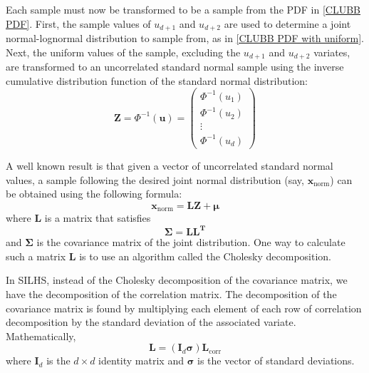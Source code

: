 \documentclass[11pt,fleqn]{article}
\begin{document}
Each sample must now be transformed to be a sample from the PDF in \eqref{CLUBB
PDF}. First, the sample values of $u_{d+1}$ and $u_{d+2}$ are used to determine
a joint normal-lognormal distribution to sample from, as in \eqref{CLUBB PDF
with uniform}. Next, the uniform values of the sample, excluding the $u_{d+1}$
and $u_{d+2}$ variates, are transformed to an uncorrelated standard normal
sample using the inverse cumulative distribution function of the standard normal
distribution:
\begin{equation}
\mathbf{Z} = \Phi^{-1} (\mathbf{u}) = 
\left(
\begin{array}{c}
\Phi^{-1} (u_1) \\
\Phi^{-1} (u_2) \\
\vdots          \\
\Phi^{-1} (u_d)
\end{array}
\right)
\end{equation}

A well known result is that given a vector of uncorrelated standard normal
values, a sample following the desired joint normal distribution (say,
$\mathbf{x}_\mathrm{norm}$) can be obtained using the following formula:
\begin{equation}
\mathbf{x}_\mathrm{norm} = \mathbf{L}\mathbf{Z} + \bm{\mu}
\end{equation}
where $\mathbf{L}$ is a matrix that satisfies
\begin{equation}
\mathbf{\Sigma} = \mathbf{L} \mathbf{L}^\mathbf{T}
\end{equation}
and $\mathbf{\Sigma}$ is the covariance matrix of the joint distribution. One
way to calculate such a matrix $\mathbf{L}$ is to use an algorithm called the
Cholesky decomposition.

In SILHS, instead of the Cholesky decomposition of the covariance matrix, we
have the decomposition of the correlation matrix. The decomposition of the
covariance matrix is found by multiplying each element of each row of
correlation decomposition by the standard deviation of the associated variate.
Mathematically,
\begin{equation}
\mathbf{L} = \left(\mathbf{I}_d \bm{\sigma}\right) \mathbf{L}_\mathrm{corr}
\end{equation}
where $\mathbf{I}_d$ is the $d\times d$ identity matrix and $\bm{\sigma}$ is the
vector of standard deviations.
\end{document}
